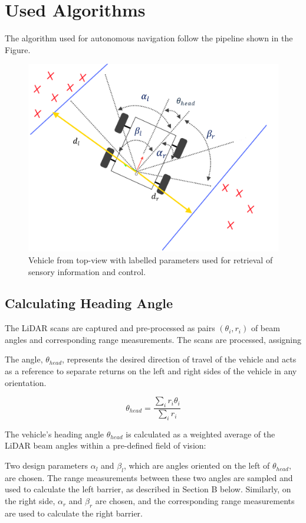\documentclass[conference]{IEEEtran}
\begin{document}
\section{Used Algorithms}
The algorithm used for autonomous navigation follow the pipeline shown in the Figure.   

\begin{figure}
    \centering
    \includegraphics[scale=0.2]{diagram.png}
    \caption{Vehicle from top-view with labelled parameters used for retrieval of sensory information and control.}
    \label{Figure 3}
\end{figure}

\subsection{Calculating Heading Angle}

The LiDAR scans are captured and pre-processed as pairs $(\theta_i, r_i)$ of beam angles and corresponding range measurements. The scans are processed, assigning 

The angle, $\theta_{head}$, represents the desired direction of travel of the vehicle and acts as a reference to separate returns on the left and right sides of the vehicle in any orientation. 

\[\theta_{head} = \frac{\sum_{i} r_i \theta_i}{\sum_{i} r_i} \]

The vehicle's heading angle $\theta_{head}$ is calculated as a weighted average of the LiDAR beam angles within a pre-defined field of vision:

Two design parameters $\alpha_l$ and $\beta_l$, which are angles oriented on the left of $\theta_{head}$, are chosen.  The range measurements between these two angles are sampled and used to calculate the left barrier, as described in Section B below. Similarly, on the right side, $\alpha_r$ and $\beta_r$ are chosen, and the corresponding range measurements are used to calculate the right barrier. 
\end{document}
